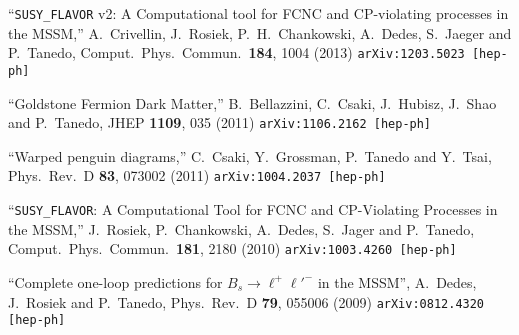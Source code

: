 \documentclass[margin,line]{resume}
\begin{document}
\begin{resume}
``\texttt{SUSY\_FLAVOR} v2: A Computational tool for FCNC and CP-violating processes in the MSSM,''
  A.~Crivellin, J.~Rosiek, P.~H.~Chankowski, A.~Dedes, S.~Jaeger and P.~Tanedo,
  Comput.\ Phys.\ Commun.\  {\bf 184}, 1004 (2013)
\texttt{arXiv:1203.5023 [hep-ph]} 

\vspace{-2mm}
 
%
 
``Goldstone Fermion Dark Matter,''
  B.~Bellazzini, C.~Csaki, J.~Hubisz, J.~Shao and P.~Tanedo,
  JHEP {\bf 1109}, 035 (2011)
\texttt{arXiv:1106.2162 [hep-ph]} 

\vspace{-2mm}
 
``Warped penguin diagrams,''
  C.~Csaki, Y.~Grossman, P.~Tanedo and Y.~Tsai,
  Phys.\ Rev.\ D {\bf 83}, 073002 (2011)
\texttt{arXiv:1004.2037 [hep-ph]} 

\vspace{-2mm}
 
``\texttt{SUSY\_FLAVOR}: A Computational Tool for FCNC and CP-Violating Processes in the MSSM,''
  J.~Rosiek, P.~Chankowski, A.~Dedes, S.~Jager and P.~Tanedo,
  Comput.\ Phys.\ Commun.\  {\bf 181}, 2180 (2010)
\texttt{arXiv:1003.4260 [hep-ph]} 

\vspace{-2mm}
 
``Complete one-loop predictions for $B_s \rightarrow \ell^+\ell'^-$ in the MSSM'', 
  A.~Dedes, J.~Rosiek and P.~Tanedo,
  Phys.\ Rev.\ D {\bf 79}, 055006 (2009)
\texttt{arXiv:0812.4320 [hep-ph]} 





\end{resume}
\end{document}
